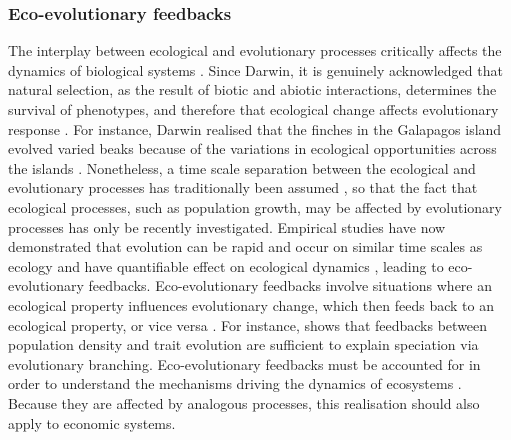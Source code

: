 \subsubsection*{Eco-evolutionary feedbacks}
% 
The interplay between ecological and evolutionary processes critically affects the dynamics of biological systems \cite{Pelletier2009}.
% 
Since Darwin, it is genuinely acknowledged that natural selection, as the result of biotic and abiotic interactions, determines the survival of phenotypes, and therefore that ecological change affects evolutionary response \cite{Ezard2009}.
% 
For instance, Darwin realised that the finches in the Galapagos island evolved varied beaks because of the variations in ecological opportunities across the islands \cite{darwin2004origin}.
% 
Nonetheless, a time scale separation between the ecological and evolutionary processes has traditionally been assumed \cite{slobodkin1980growth}, so that the fact that ecological processes, such as population growth, may be affected by evolutionary processes has only be recently investigated. Empirical studies have now demonstrated that evolution can be rapid and occur on similar time scales as ecology \cite{Hairston2005} and have quantifiable effect on ecological dynamics \cite{Ezard2009}, leading to eco-evolutionary feedbacks. 
% 
Eco-evolutionary feedbacks involve situations where an ecological property influences evolutionary change, which then feeds back to an ecological property, or vice versa \cite{Govaert2019a}. For instance, \cite{Dieckmann1999} shows that feedbacks between population density and trait evolution are sufficient to explain speciation via evolutionary branching.
% 
% 
Eco-evolutionary feedbacks must be accounted for in order to understand the mechanisms driving the dynamics of ecosystems \cite{Govaert2019a}. Because they are affected by analogous processes, this realisation should also apply to economic systems.

